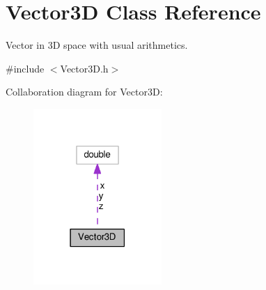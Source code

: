 \hypertarget{classVector3D}{}\section{Vector3D Class Reference}
\label{classVector3D}


Vector in 3D space with usual arithmetics.  




{\ttfamily \#include $<$Vector3\+D.\+h$>$}



Collaboration diagram for Vector3D\+:\nopagebreak
\begin{figure}[H]
\begin{center}
\leavevmode
\includegraphics[width=138pt]{classVector3D__coll__graph}
\end{center}
\end{figure}
